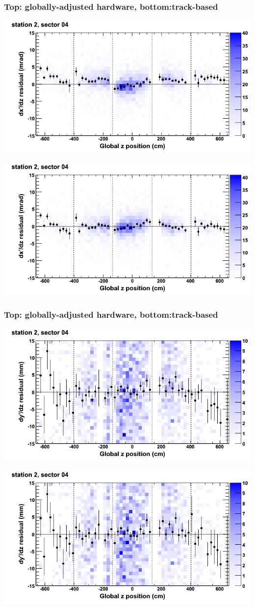 \documentclass[compress]{beamer}
\begin{document}
\begin{frame}
\frametitle{Top: globally-adjusted hardware, bottom:track-based}
\includegraphics[width=0.7\linewidth]{NOV4_mapplots_HW/DTvsz_st2sec04_dxdz.png}

\includegraphics[width=0.7\linewidth]{NOV4_mapplots/DTvsz_st2sec04_dxdz.png}
\end{frame}

\begin{frame}
\frametitle{Top: globally-adjusted hardware, bottom:track-based}
\includegraphics[width=0.7\linewidth]{NOV4_mapplots_HW/DTvsz_st2sec04_dydz.png}

\includegraphics[width=0.7\linewidth]{NOV4_mapplots/DTvsz_st2sec04_dydz.png}
\end{frame}
\end{document}
